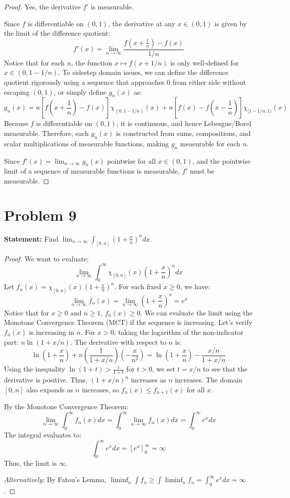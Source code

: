 \documentclass[12pt]{article}
\begin{document}
\begin{proof}
Yes, the derivative $f'$ is measurable. 

Since $f$ is differentiable on $(0,1)$, the derivative at any $x \in (0,1)$ is given by the limit of the difference quotient:
\[
f'(x) = \lim_{n \rightarrow \infty} \frac{f(x + \frac{1}{n}) - f(x)}{1/n}
\]
Notice that for each $n$, the function $x \mapsto f(x + 1/n)$ is only well-defined for $x \in (0, 1 - 1/n)$. To sidestep domain issues, we can define the difference quotient rigorously using a sequence that approaches 0 from either side without escaping $(0,1)$, or simply define $g_n(x)$ as:
\[
g_n(x) = n \left[ f\left(x + \frac{1}{n}\right) - f(x) \right] \chi_{(0, 1 - 1/n)}(x) + n \left[ f(x) - f\left(x - \frac{1}{n}\right) \right] \chi_{[1 - 1/n, 1)}(x)
\]
Because $f$ is differentiable on $(0,1)$, it is continuous, and hence Lebesgue/Borel measurable. Therefore, each $g_n(x)$ is constructed from sums, compositions, and scalar multiplications of measurable functions, making $g_n$ measurable for each $n$. 

Since $f'(x) = \lim_{n \to \infty} g_n(x)$ pointwise for all $x \in (0,1)$, and the pointwise limit of a sequence of measurable functions is measurable, $f'$ must be measurable.
\end{proof}

\section*{Problem 9}
\textbf{Statement:} Find $\lim_{n\rightarrow\infty}\int_{[0,n]}\left(1+\frac{x}{n}\right)^{n}dx$.

\begin{proof}
We want to evaluate:
\[
\lim_{n \to \infty} \int_0^\infty \chi_{[0,n]}(x) \left(1 + \frac{x}{n}\right)^n dx
\]
Let $f_n(x) = \chi_{[0,n]}(x) \left(1 + \frac{x}{n}\right)^n$. For each fixed $x \ge 0$, we have:
\[
\lim_{n \to \infty} f_n(x) = \lim_{n \to \infty} \left(1 + \frac{x}{n}\right)^n = e^x
\]
Notice that for $x \ge 0$ and $n \ge 1$, $f_n(x) \ge 0$. We can evaluate the limit using the Monotone Convergence Theorem (MCT) if the sequence is increasing. Let's verify $f_n(x)$ is increasing in $n$. 
For $x > 0$, taking the logarithm of the non-indicator part: $n \ln(1 + x/n)$. The derivative with respect to $n$ is:
\[
\ln\left(1 + \frac{x}{n}\right) + n \left(\frac{1}{1 + x/n}\right) \left(-\frac{x}{n^2}\right) = \ln\left(1 + \frac{x}{n}\right) - \frac{x/n}{1 + x/n}
\]
Using the inequality $\ln(1+t) > \frac{t}{1+t}$ for $t > 0$, we set $t = x/n$ to see that the derivative is positive. Thus, $(1+x/n)^n$ increases as $n$ increases. The domain $[0,n]$ also expands as $n$ increases, so $f_n(x) \le f_{n+1}(x)$ for all $x$. 

By the Monotone Convergence Theorem:
\[
\lim_{n \to \infty} \int_0^\infty f_n(x) dx = \int_0^\infty \lim_{n \to \infty} f_n(x) dx = \int_0^\infty e^x dx
\]
The integral evaluates to:
\[
\int_0^\infty e^x dx = \left[ e^x \right]_0^\infty = \infty
\]
Thus, the limit is $\infty$. 

\textit{Alternatively:} By Fatou's Lemma, $\liminf_{n} \int f_n \ge \int \liminf_n f_n = \int_0^\infty e^x dx = \infty$.
\end{proof}
\end{document}

